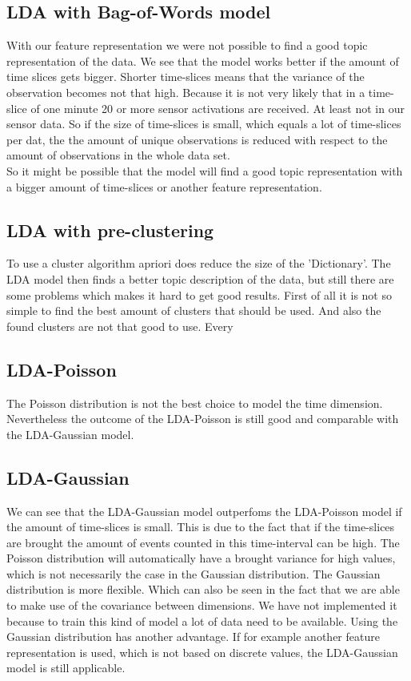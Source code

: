 \documentclass[11pt,a4paper]{article}
\begin{document}
\subsection{LDA with Bag-of-Words model}
With our feature representation we were not possible to find a good topic representation of the data. We see that the model works better if the amount of time slices gets bigger. Shorter time-slices means that the variance of the observation becomes not that high. Because it is not very likely that in a time-slice of one minute 20 or more sensor activations are received. At least not in our sensor data.  So if the size of time-slices is small, which equals a lot of time-slices per dat, the the amount of unique observations is reduced with respect to the amount of observations in the whole data set.\\
So it might be possible that the model will find a good topic representation with a bigger amount of time-slices or another feature representation.

\subsection{LDA with pre-clustering}
To use a cluster algorithm apriori does reduce the size of the 'Dictionary'. The LDA model then finds a better topic description of the data, but still there are some problems which makes it hard to get good results. First of all it is not so simple to find the best amount of clusters that should be used. And also the found clusters are not that good to use. Every 

\subsection{LDA-Poisson}
The Poisson distribution is not the best choice to model the time dimension. Nevertheless the outcome of the LDA-Poisson is still good and comparable with the LDA-Gaussian model.

\subsection{LDA-Gaussian}
We can see that the LDA-Gaussian model outperfoms the LDA-Poisson model if the amount of time-slices is small. This is due to the fact that if the time-slices are brought the amount of events counted in this time-interval can be high. The Poisson distribution will automatically have a brought variance for high values, which is not necessarily the case in the Gaussian distribution. The Gaussian distribution is more flexible. Which can also be seen in the fact that we are able to make use of the covariance between dimensions. We have not implemented it because to train this kind of model a lot of data need to be available.
Using the Gaussian distribution has another advantage. If for example another feature representation is used, which is not based on discrete values, the LDA-Gaussian model is still applicable.
\\
\end{document}
